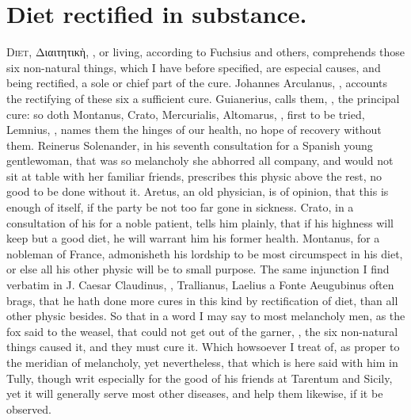 {%
\section{Diet rectified in substance.}

\lettrine{D}{iet}, \textgreek[variant=ancient]{Διαιτητικὴ}, , or living, according to Fuchsius and others, comprehends those six non-natural things, which I have before specified, are especial causes, and being rectified, a sole or chief part of the cure. Johannes Arculanus, , accounts the rectifying of these six a sufficient cure. Guianerius,  calls them, , the principal cure: so doth Montanus, Crato, Mercurialis, Altomarus, \etc{}, first to be tried, Lemnius, , names them the hinges of our health, no hope of recovery without them. Reinerus Solenander, in his seventh consultation for a Spanish young gentlewoman, that was so melancholy she abhorred all company, and would not sit at table with her familiar friends, prescribes this physic above the rest, no good to be done without it. Aretus,  an old physician, is of opinion, that this is enough of itself, if the party be not too far gone in sickness. Crato, in a consultation of his for a noble patient, tells him plainly, that if his highness will keep but a good diet, he will warrant him his former health. Montanus,  for a nobleman of France, admonisheth his lordship to be most circumspect in his diet, or else all his other physic will be to small purpose. The same injunction I find verbatim in J. Caesar Claudinus, ,  Trallianus,  Laelius a Fonte Aeugubinus often brags, that he hath done more cures in this kind by rectification of diet, than all other physic besides. So that in a word I may say to most melancholy men, as the fox said to the weasel, that could not get out of the garner, , the six non-natural things caused it, and they must cure it. Which howsoever I treat of, as proper to the meridian of melancholy, yet nevertheless, that which is here said with him in Tully, though writ especially for the good of his friends at Tarentum and Sicily, yet it will generally serve most other diseases, and help them likewise, if it be observed.

}
